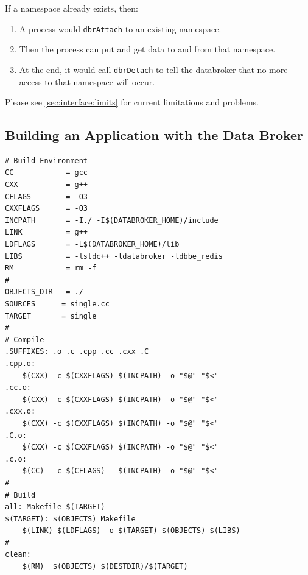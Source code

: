 \noindent If a namespace already exists, then:
\begin{enumerate}
\item A process would \texttt{dbrAttach} to an existing namespace.
\item Then the process can put and get data to and from that namespace.
\item At the end, it would call \texttt{dbrDetach} to tell the databroker
  that no more access to that namespace will occur.
\end{enumerate}

Please see \ref{sec:interface:limits} for current limitations and
problems.

\subsection{Building an Application with the Data Broker}
\begin{lstlisting}[basicstyle=\scriptsize\ttfamily,backgroundcolor=\color{backcolour},caption=Example Makefile,captionpos=b,label=code:Makefile]
# Build Environment
CC            = gcc
CXX           = g++
CFLAGS        = -O3
CXXFLAGS      = -O3
INCPATH       = -I./ -I$(DATABROKER_HOME)/include
LINK          = g++ 
LDFLAGS       = -L$(DATABROKER_HOME)/lib
LIBS          = -lstdc++ -ldatabroker -ldbbe_redis
RM            = rm -f
# 
OBJECTS_DIR   = ./
SOURCES      = single.cc
TARGET       = single
#
# Compile
.SUFFIXES: .o .c .cpp .cc .cxx .C
.cpp.o:
    $(CXX) -c $(CXXFLAGS) $(INCPATH) -o "$@" "$<"
.cc.o:
    $(CXX) -c $(CXXFLAGS) $(INCPATH) -o "$@" "$<"
.cxx.o:
    $(CXX) -c $(CXXFLAGS) $(INCPATH) -o "$@" "$<"
.C.o:
    $(CXX) -c $(CXXFLAGS) $(INCPATH) -o "$@" "$<"
.c.o:
    $(CC)  -c $(CFLAGS)   $(INCPATH) -o "$@" "$<"
# 
# Build 
all: Makefile $(TARGET)
$(TARGET): $(OBJECTS) Makefile
    $(LINK) $(LDFLAGS) -o $(TARGET) $(OBJECTS) $(LIBS)
# 
clean:
    $(RM)  $(OBJECTS) $(DESTDIR)/$(TARGET)
\end{lstlisting}


